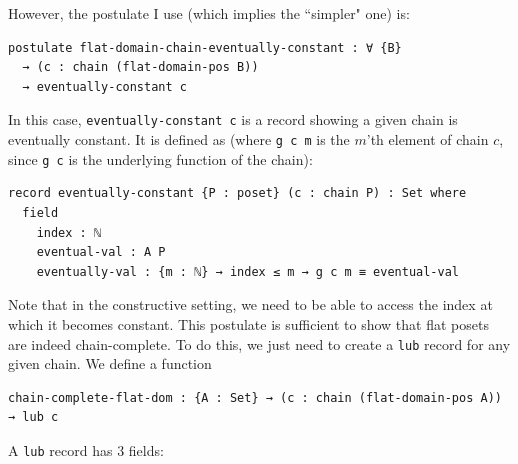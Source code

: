 \documentclass[12pt,a4paper,twoside,openright]{report}
\begin{document}
However, the postulate I use (which implies the ``simpler" one) is:
\begin{verbatim}
postulate flat-domain-chain-eventually-constant : ∀ {B} 
  → (c : chain (flat-domain-pos B)) 
  → eventually-constant c
\end{verbatim}
In this case, \texttt{eventually-constant c} is a record showing a given chain is eventually constant. It is defined as (where \texttt{g c m} is the $m$'th element of chain $c$, since \texttt{g c} is the underlying function of the chain):
\begin{verbatim}
record eventually-constant {P : poset} (c : chain P) : Set where
  field
    index : ℕ
    eventual-val : A P
    eventually-val : {m : ℕ} → index ≤ m → g c m ≡ eventual-val
\end{verbatim}
Note that in the constructive setting, we need to be able to access the index at which it becomes constant. This postulate is sufficient to show that flat posets are indeed chain-complete. To do this, we just need to create a \texttt{lub} record for any given chain. We define a function
\begin{verbatim}
chain-complete-flat-dom : {A : Set} → (c : chain (flat-domain-pos A)) → lub c
\end{verbatim}
A \texttt{lub} record has 3 fields: 
\end{document}
